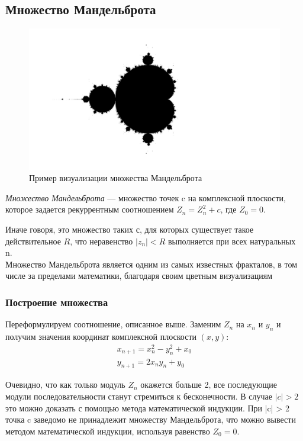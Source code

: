 \documentclass[a4paper, 12pt]{article}
\begin{document}
\subsection*{Множество Мандельброта}
\begin{figure}[h]
    \centering
    \includegraphics[width=1\linewidth]{mandelbrot_example.png}
    \caption{Пример визуализации множества Мандельброта}
\end{figure}
\textit{Множество Мандельброта} — множество точек c на комплексной плоскости, которое задается рекуррентным соотношением $Z_n = Z_n^2 + c$, где $Z_0 = 0$.

Иначе говоря, это множество таких $с$, для которых существует такое действительное $R$, что неравенство $|z_n| < R$ выполняется при всех натуральных n.\\

Множество Мандельброта является одним из самых известных фракталов, в том числе за пределами математики, благодаря своим цветным визуализациям
\subsubsection*{Построение множества}
Переформулируем соотношение, описанное выше. Заменим $Z_n$ на $x_n$ и $y_n$ и получим значения координат комплексной плоскости $(x, y)$:
\begin{align} 
    x_{n+1} = x_n^2 - y_n^2 + x_0 \nonumber\\
    y_{n+1} = 2x_ny_n + y_0 \label{calc_expressions}
\end{align}

Очевидно, что как только модуль $Z_n$ окажется больше 2, все последующие модули последовательности станут стремиться к бесконечности. В случае $|c| > 2$ это можно доказать с помощью метода математической индукции. При |c| > 2 точка c заведомо не принадлежит множеству Мандельброта, что можно вывести методом математической индукции, используя равенство $Z_0 = 0$.
\newpage
\end{document}

